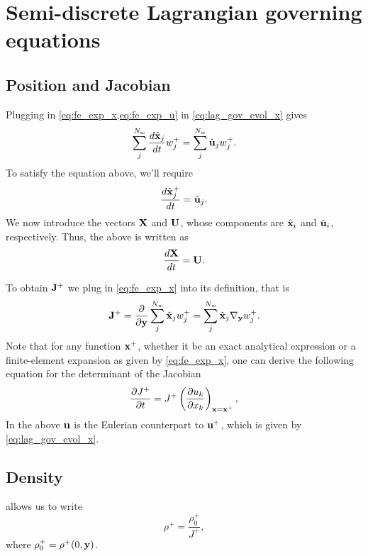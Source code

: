 \documentclass[11pt]{report}
\begin{document}
\section{Semi-discrete Lagrangian governing equations}
\subsection{Position and Jacobian}
Plugging in \cref{eq:fe_exp_x,eq:fe_exp_u} in \cref{eq:lag_gov_evol_x} gives
\begin{equation}
    \sum_{j}^{N_w} \frac{d \hat{\mathbf{x}}_j}{dt} w^+_j = \sum_{j}^{N_w} \hat{\mathbf{u}}_j w^+_j.
\end{equation}
To satisfy the equation above, we'll require
\begin{equation}
    \frac{d \hat{\mathbf{x}}^+_j}{dt} = \hat{\mathbf{u}}_j.
\end{equation}
We now introduce the vectors $\mathbf{X}$ and $\mathbf{U}$, whose components are $\hat{\mathbf{x}}_i$ and $\hat{\mathbf{u}}_i$, respectively. Thus, the above is written as
\begin{equation}
    \frac{d\mathbf{X}}{dt} = \mathbf{U}.
\end{equation}

To obtain $\mathbf{J}^+$ we plug in \cref{eq:fe_exp_x} into its definition, that is
\begin{equation}
    \mathbf{J}^+ = \frac{\partial}{\partial \mathbf{y}} \sum_j^{N_w} \hat{\mathbf{x}}_j w^+_j = \sum_j^{N_w} \hat{\mathbf{x}}_j \nabla_{\mathbf{y}} w^+_j.
\end{equation}
Note that for any function $\mathbf{x}^+$, whether it be an exact analytical expression or a finite-element expansion as given by \cref{eq:fe_exp_x}, one can derive the following equation for the determinant of the Jacobian 
\begin{equation}
    \frac{\partial J^+}{\partial t} = J^+ \left ( \frac{\partial u_k}{\partial x_k} \right )_{\mathbf{x} = \mathbf{x}^+},
\end{equation}
In the above $\mathbf{u}$ is the Eulerian counterpart to $\mathbf{u}^+$, which is given by \cref{eq:lag_gov_evol_x}.

\subsection{Density}
 allows us to write
\begin{equation}
    \label{eq:evol_rho_semi_discrete}
    \rho^+ = \frac{\rho^+_0}{J^+},
\end{equation}
where $\rho^+_0 = \rho^+(0,\mathbf{y})$.
\end{document}
